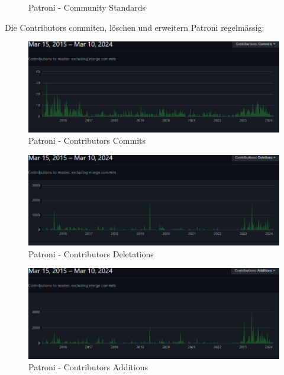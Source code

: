 \begin{flushleft}
\begin{figure}[H]
        \caption{Patroni - Community Standards}
        \label{fig:community_Standards_zalando_patroni}
    \end{figure}

    Die Contributors commiten, löschen und erweitern Patroni regelmässig:
    \begin{figure}[H]
        \centering
        \includegraphics[width=0.75\linewidth]{source/implementation/evaluation/postgresql_ha_solutions/insights/patroni/contributors_commits_zalando_patroni}
        \caption{Patroni - Contributors Commits}
        \label{fig:contributors_commits_zalando_patroni}
    \end{figure}
    \begin{figure}[H]
        \centering
        \includegraphics[width=0.75\linewidth]{source/implementation/evaluation/postgresql_ha_solutions/insights/patroni/contributors_deletations_zalando_patroni}
        \caption{Patroni - Contributors Deletations}
        \label{fig:contributors_deletations_zalando_patroni}
    \end{figure}
    \begin{figure}[H]
        \centering
        \includegraphics[width=0.75\linewidth]{source/implementation/evaluation/postgresql_ha_solutions/insights/patroni/contributors_additions_zalando_patroni}
        \caption{Patroni - Contributors Additions}
        \label{fig:contributors_additions_zalando_patroni}
    \end{figure}


\end{flushleft}
